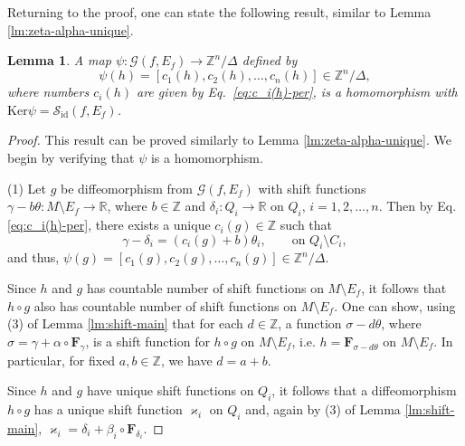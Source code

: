 \documentclass[10pt,reqno]{amsart}
\newtheorem{lemma}[subsection]{Lemma}
\newcommand{\bbR}{\mathbb{R}}
\newcommand{\bbZ}{\mathbb{Z}}
\newcommand{\bfF}{\mathbf{F}}
\newcommand{\id}{\mathrm{id}}
\renewcommand{\ker}{\mathrm{Ker}}
\begin{document}
 
 Returning to the proof, one can state the following result, similar  to Lemma \ref{lm:zeta-alpha-unique}.
\begin{lemma}\label{lm:zeta-alpha-not-unique}
	A map $\psi:\mathcal{G}(f, E_f)\to \bbZ^n/\Delta$ defined by
	\begin{equation}\label{eq:map-ZZZn-Delta}
		\psi(h) = [c_1(h), c_2(h), \ldots, c_n(h)]\in \bbZ^n/\Delta,
	\end{equation}
where numbers $c_i(h)$ are given by {\rm Eq.~\eqref{eq:c_i(h)-per}},
	is a homomorphism with $\ker\psi = \mathcal{S}_{\id}(f, E_f)$. 
\end{lemma}
\begin{proof}
This result can be proved similarly to Lemma \ref{lm:zeta-alpha-unique}.
We begin by verifying that $\psi$ is a homomorphism.	

(1) 
 Let $g$ be diffeomorphism from $\mathcal{G}(f,E_f)$ with shift functions $\gamma-b\theta:M\setminus E_f\to \bbR$, where $b\in \bbZ$ and $\delta_i: Q_i\to \bbR$ on $Q_i$, $i = 1,2,\ldots, n.$ Then by  Eq. \eqref{eq:c_i(h)-per}, there exists a unique $c_i(g)\in \bbZ$ such that 
\begin{equation}\label{eq:diff-on-Q-C}
\gamma-\delta_i = (c_i(g)+b)\theta_i, \qquad \text{on }Q_i\setminus C_i,
\end{equation}
and thus, $\psi(g) = [c_1(g), c_2(g), \ldots, c_n(g)]\in\bbZ^n/\Delta.$

Since $h$ and $g$ has countable number of shift functions on $M\setminus E_f$, it follows that $h\circ g$ also has countable number of shift functions on $M\setminus E_f$. One can show, using (3) of Lemma \ref{lm:shift-main} that for each $d\in \bbZ$, a function $\sigma -d\theta$, where $\sigma = \gamma+\alpha\circ \bfF_{\gamma}$, is a shift function for $h\circ g$ on $M\setminus E_f$, i.e. $h = \bfF_{\sigma-d\theta}$ on $M\setminus E_f$.  In particular, for fixed $a,b\in\bbZ$, we have $d = a+b$.


Since $h$ and $g$ have unique shift functions on $Q_i$, it follows that
a diffeomorphism $h\circ g$ has a unique shift function $\varkappa_i$ on $Q_i$ and, again by (3) of Lemma \ref{lm:shift-main}, $\varkappa_i = \delta_i+\beta_i\circ \bfF_{\delta_i}.$



\end{proof}
\end{document}
